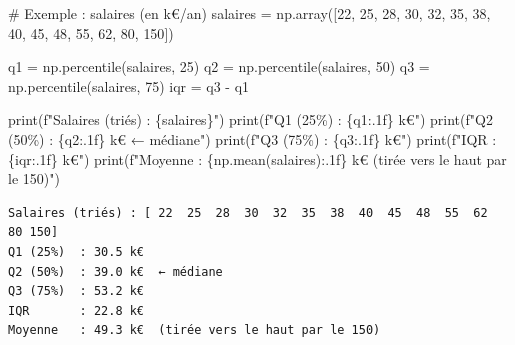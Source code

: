 \documentclass[
  french,
  11pt,
  a4paper,
]{scrbook}
\newenvironment{Shaded}{}{}
\newcommand{\BuiltInTok}[1]{\textcolor[rgb]{0.84,0.23,0.29}{#1}}
\newcommand{\CommentTok}[1]{\textcolor[rgb]{0.42,0.45,0.49}{#1}}
\newcommand{\DecValTok}[1]{\textcolor[rgb]{0.00,0.36,0.77}{#1}}
\newcommand{\NormalTok}[1]{\textcolor[rgb]{0.14,0.16,0.18}{#1}}
\newcommand{\OperatorTok}[1]{\textcolor[rgb]{0.14,0.16,0.18}{#1}}
\newcommand{\SpecialCharTok}[1]{\textcolor[rgb]{0.00,0.36,0.77}{#1}}
\newcommand{\SpecialStringTok}[1]{\textcolor[rgb]{0.01,0.18,0.38}{#1}}
\begin{document}
\begin{Shaded}
\begin{Highlighting}[]
\CommentTok{\# Exemple : salaires (en k€/an)}
\NormalTok{salaires }\OperatorTok{=}\NormalTok{ np.array([}\DecValTok{22}\NormalTok{, }\DecValTok{25}\NormalTok{, }\DecValTok{28}\NormalTok{, }\DecValTok{30}\NormalTok{, }\DecValTok{32}\NormalTok{, }\DecValTok{35}\NormalTok{, }\DecValTok{38}\NormalTok{, }\DecValTok{40}\NormalTok{, }\DecValTok{45}\NormalTok{, }\DecValTok{48}\NormalTok{, }\DecValTok{55}\NormalTok{, }\DecValTok{62}\NormalTok{, }\DecValTok{80}\NormalTok{, }\DecValTok{150}\NormalTok{])}

\NormalTok{q1 }\OperatorTok{=}\NormalTok{ np.percentile(salaires, }\DecValTok{25}\NormalTok{)}
\NormalTok{q2 }\OperatorTok{=}\NormalTok{ np.percentile(salaires, }\DecValTok{50}\NormalTok{)}
\NormalTok{q3 }\OperatorTok{=}\NormalTok{ np.percentile(salaires, }\DecValTok{75}\NormalTok{)}
\NormalTok{iqr }\OperatorTok{=}\NormalTok{ q3 }\OperatorTok{{-}}\NormalTok{ q1}

\BuiltInTok{print}\NormalTok{(}\SpecialStringTok{f"Salaires (triés) : }\SpecialCharTok{\{}\NormalTok{salaires}\SpecialCharTok{\}}\SpecialStringTok{"}\NormalTok{)}
\BuiltInTok{print}\NormalTok{(}\SpecialStringTok{f"Q1 (25\%)  : }\SpecialCharTok{\{}\NormalTok{q1}\SpecialCharTok{:.1f\}}\SpecialStringTok{ k€"}\NormalTok{)}
\BuiltInTok{print}\NormalTok{(}\SpecialStringTok{f"Q2 (50\%)  : }\SpecialCharTok{\{}\NormalTok{q2}\SpecialCharTok{:.1f\}}\SpecialStringTok{ k€  ← médiane"}\NormalTok{)}
\BuiltInTok{print}\NormalTok{(}\SpecialStringTok{f"Q3 (75\%)  : }\SpecialCharTok{\{}\NormalTok{q3}\SpecialCharTok{:.1f\}}\SpecialStringTok{ k€"}\NormalTok{)}
\BuiltInTok{print}\NormalTok{(}\SpecialStringTok{f"IQR       : }\SpecialCharTok{\{}\NormalTok{iqr}\SpecialCharTok{:.1f\}}\SpecialStringTok{ k€"}\NormalTok{)}
\BuiltInTok{print}\NormalTok{(}\SpecialStringTok{f"Moyenne   : }\SpecialCharTok{\{}\NormalTok{np}\SpecialCharTok{.}\NormalTok{mean(salaires)}\SpecialCharTok{:.1f\}}\SpecialStringTok{ k€  (tirée vers le haut par le 150)"}\NormalTok{)}
\end{Highlighting}
\end{Shaded}

\begin{verbatim}
Salaires (triés) : [ 22  25  28  30  32  35  38  40  45  48  55  62  80 150]
Q1 (25%)  : 30.5 k€
Q2 (50%)  : 39.0 k€  ← médiane
Q3 (75%)  : 53.2 k€
IQR       : 22.8 k€
Moyenne   : 49.3 k€  (tirée vers le haut par le 150)
\end{verbatim}
\end{document}
